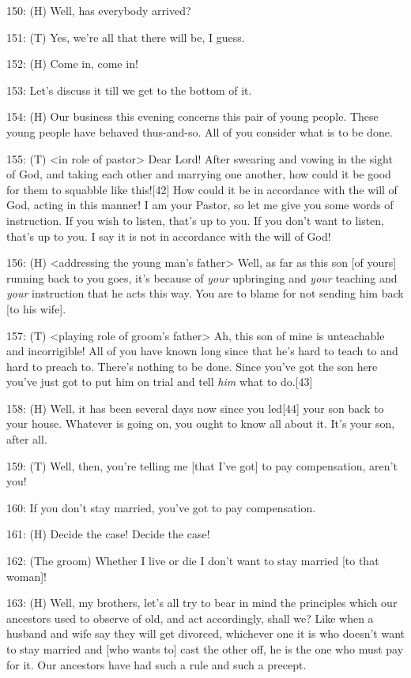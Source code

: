 {150: (H) Well, has everybody arrived?}

{151: (T) Yes, we're all that there will be, I guess.}

{152: (H) Come in, come in!}

{153: Let's discuss it till we get to the bottom of it.}

{154: (H) Our business this evening concerns this pair of young people.
These young people have behaved thus-and-so. All of you consider what is to be
done. }

{155: (T) <in role of pastor> Dear Lord! After swearing
and vowing in the sight of God, and taking each other and marrying one another,
how could it be good for them to squabble like this![42] How could it be in accordance
with the will of God, acting in this manner! I am your Pastor, so let me give you
some words of instruction. If you wish to listen, that's up to you. If you don't
want to listen, that's up to you. I say it is not in accordance with the will of
God! }

{156: (H) <addressing the young man's father> Well, as
far as this son [of yours] running back to you goes, it's because of }{\textit{your}}{
upbringing and }{\textit{your}}{ teaching and }{\textit{your}}{
instruction that he acts this way. You are to blame for not sending him back [to
his wife]. }

{157: (T) <playing role of groom's father> Ah, this son
of mine is unteachable and incorrigible! All of you have known long since that
he's hard to teach to and hard to preach to. There's nothing to be done. Since
you've got the son}{\textit{ }}{here you've just got to put him on
trial and tell }{\textit{him}}{ what to do.[43]}

{158: (H) Well, it has been several days now since you led[44] your son
back to your house. Whatever is going on, you ought to know all about it. It's
your son, after all.}

{159: (T) Well, then, you're telling me [that I've got] to pay compensation,
aren't you!}

{160: If you don't stay married, you've got to pay compensation.}

{161: (H) Decide the case! Decide the case!}

{162: (The groom) Whether I live or die I don't want to stay married [to
that woman]!}

{163: (H) Well, my brothers, let's all try to bear in mind the principles
which our ancestors used to observe of old, and act accordingly, shall we? Like
when a husband and wife say they will get divorced, whichever one it is who doesn't
want to stay married and [who wants to] cast the other off, he is the one who must
pay for it. Our ancestors have had such a rule and such a precept.}

